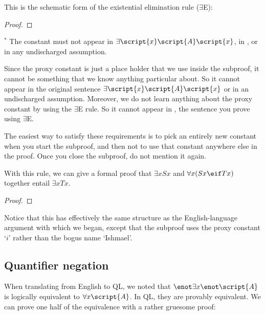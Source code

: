 This is the schematic form of the existential elimination rule ($\exists$E): 

\begin{proof}
	\open	
	\close
	 
\end{proof}
$^\ast$ The constant  must not appear in $\exists\script{x}\script{A}\script{x}$, in , or in any undischarged assumption.

Since the proxy constant is just a place holder that we use inside the subproof, it cannot be something that we know anything particular about. So it cannot appear in the original sentence $\exists\script{x}\script{A}\script{x}$ or in an undischarged assumption. Moreover, we do not learn anything about the proxy constant by using the $\exists$E rule. So it cannot appear in , the sentence you prove using $\exists$E.

The easiest way to satisfy these requirements is to pick an entirely new constant when you start the subproof, and then not to use that constant anywhere else in the proof. Once you close the subproof, do not mention it again.

With this rule, we can give a formal proof that $\exists x Sx$ and $\forall x(Sx \eif Tx)$ together entail $\exists x Tx$.



\begin{proof}
	\open
		 
	\close
\end{proof}

Notice that this has effectively the same structure as the English-language argument with which we began, except that the subproof uses the proxy constant `$i$' rather than the bogus name `Ishmael'.

\subsection{Quantifier negation}

When translating from English to QL, we noted that $\enot\exists x\enot\script{A}$ is logically equivalent to $\forall x\script{A}$. In QL, they are provably equivalent. We can prove one half of the equivalence with a rather gruesome proof:

